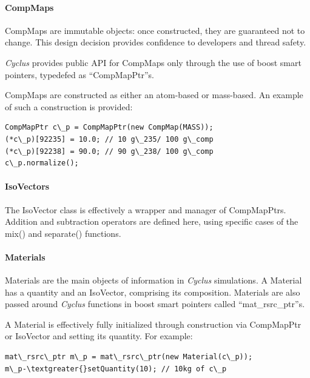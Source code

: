 \documentclass[letterpaper,10pt,english]{sphinxmanual}
\begin{document}
\paragraph{CompMaps}
\label{devdoc/materials_and_isotopes:compmaps}
CompMaps are immutable objects: once constructed, they are guaranteed not to change. This
design decision provides confidence to developers and thread safety.

\emph{Cyclus} provides public API for CompMaps only through the use of boost smart pointers,
typedefed as ``CompMapPtr''s.

CompMaps are constructed as either an atom-based or mass-based. An example of such a construction
is provided:

\begin{Verbatim}[commandchars=\\\{\}]
CompMapPtr c\_p = CompMapPtr(new CompMap(MASS));
(*c\_p)[92235] = 10.0; // 10 g\_235/ 100 g\_comp
(*c\_p)[92238] = 90.0; // 90 g\_238/ 100 g\_comp
c\_p.normalize();
\end{Verbatim}


\paragraph{IsoVectors}
\label{devdoc/materials_and_isotopes:isovectors}
The IsoVector class is effectively a wrapper and manager of CompMapPtrs. Addition and
subtraction operators are defined here, using specific cases of the mix() and separate()
functions.


\paragraph{Materials}
\label{devdoc/materials_and_isotopes:materials}
Materials are the main objects of information in \emph{Cyclus} simulations. A Material has a quantity
and an IsoVector, comprising its composition. Materials are also passed around \emph{Cyclus} functions
in boost smart pointers called ``mat\_rsrc\_ptr''s.

A Material is effectively fully initialized through construction via CompMapPtr or IsoVector and
setting its quantity. For example:

\begin{Verbatim}[commandchars=\\\{\}]
mat\_rsrc\_ptr m\_p = mat\_rsrc\_ptr(new Material(c\_p));
m\_p-\textgreater{}setQuantity(10); // 10kg of c\_p
\end{Verbatim}
\end{document}
